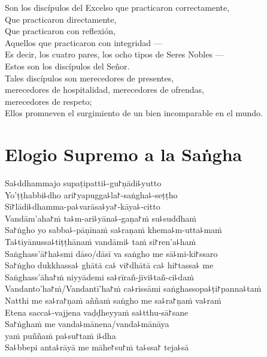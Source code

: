 Son los discípulos del Excelso que practicaron correctamente,\\
Que practicaron directamente,\\
Que practicaron con reflexión,\\
Aquellos que practicaron con integridad ---\\
Es decir, los cuatro pares, los ocho tipos de Seres Nobles ---\\
Estos son los discípulos del Señor.\\
Tales discípulos son merecedores de presentes,\\
\vin merecedores de hospitalidad, merecedores de ofrendas,\\
\vin merecedores de respeto;\\
Ellos promueven el surgimiento de un bien incomparable en el mundo.

\clearpage

\chapter*{Elogio Supremo a la Saṅgha}

\begin{leader}
\end{leader}

Sa꜕ddhammajo supaṭipatti꜕-gu꜓ṇādi꜕yutto\\
Yo'ṭṭhabbi꜕dho ari꜓yapugga꜕la꜓-saṅgha꜕-seṭṭho\\
Sī꜓lādi꜕dhamma-pa꜕varāsa꜕ya꜓-kāya꜕-citto\\
Vandām'aha꜓ṁ ta꜕m-ari꜕yāna꜕-gaṇa꜓ṁ su꜕suddhaṁ\\
Sa꜓ṅgho yo sabba꜕-pāṇīnaṁ sa꜕raṇaṁ khema꜕m-utta꜕maṁ\\
Ta꜕tiyānussa꜕tiṭṭhānaṁ vandāmi꜕ taṁ si꜓ren'a꜕haṁ\\
Saṅghass'ā꜓ha꜕smi dāso/dāsī va saṅgho me sā꜕mi-ki꜓ssaro\\
Sa꜓ṅgho dukkhassa꜕ ghātā ca꜕ vi꜓dhātā ca꜕ hi꜓tassa꜕ me\\
Saṅghass'āha꜓ṁ niyyādemi sa꜕rīrañ-jīvi꜕tañ-ci꜕daṁ\\
Vandanto'ha꜓ṁ/Vandantī'ha꜓ṁ ca꜕rissāmi saṅghassopa꜕ṭi꜓panna꜕taṁ\\
Natthi me sa꜕ra꜓ṇaṁ aññaṁ saṅgho me sa꜕ra꜓ṇaṁ va꜕raṁ\\
Etena sacca꜕-vajjena vaḍḍheyyaṁ sa꜕tthu-sā꜓sane\\
Sa꜓ṅghaṁ me vanda꜕mānena/vanda꜕mānāya\\
\vin yaṁ puññaṁ pa꜕su꜓taṁ i꜕dha\\
Sa꜕bbepi anta꜕rāyā me māhe꜓su꜓ṁ ta꜕ssa꜓ teja꜕sā

